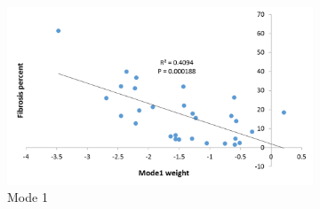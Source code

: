 \newpage

\begin{figure}[H] 
\centering
\begin{subfigure}{.65\linewidth}%
  \includegraphics[width=\linewidth,trim={{.0\wd0} {.0\wd0} {.0\wd0} {.0\wd0}},clip]{QuantitativeAnalysis/Image/Mode1AgainstFibrosis.png} %
  \caption{Mode 1}
  \label{fig:ShapeVSFibrosis-a} 
\end{subfigure} 
\begin{subfigure}{.65\linewidth}%

\end{subfigure}
\end{figure}
